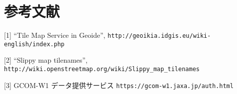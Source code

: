 
\section*{参考文献}
         [1] ``Tile Map Service in Geoide'', \texttt{http://geoikia.idgis.eu/wiki-english/index.php}
       
       [2] ``Slippy map tilenames'', \texttt{http://wiki.openstreetmap.org/wiki/Slippy\_map\_tilenames}
       
[3] GCOM-W1 データ提供サービス \texttt{https://gcom-w1.jaxa.jp/auth.html}

